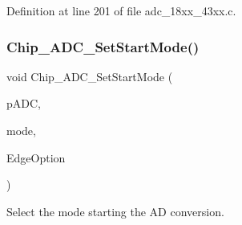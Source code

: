 Definition at line 201 of file adc\+\_\+18xx\+\_\+43xx.\+c.

\mbox{\label{group___a_d_c__18_x_x__43_x_x_ga951b5b680e4d3be64c83fc6e1caf644d}} 
\subsubsection{\texorpdfstring{Chip\+\_\+\+A\+D\+C\+\_\+\+Set\+Start\+Mode()}{Chip\_ADC\_SetStartMode()}}
{\footnotesize\ttfamily void Chip\+\_\+\+A\+D\+C\+\_\+\+Set\+Start\+Mode (\begin{DoxyParamCaption}\item[{\hyperlink{struct_l_p_c___a_d_c___t}{L\+P\+C\+\_\+\+A\+D\+C\+\_\+T} $\ast$}]{p\+A\+DC,  }\item[{\hyperlink{group___a_d_c__18_x_x__43_x_x_ga68aae5a89b4dabc910e457a00e57ea8c}{A\+D\+C\+\_\+\+S\+T\+A\+R\+T\+\_\+\+M\+O\+D\+E\+\_\+T}}]{mode,  }\item[{\hyperlink{group___a_d_c__18_x_x__43_x_x_ga18d12879b004e16af3b47467a2d81d56}{A\+D\+C\+\_\+\+E\+D\+G\+E\+\_\+\+C\+F\+G\+\_\+T}}]{Edge\+Option }\end{DoxyParamCaption})}



Select the mode starting the AD conversion. 


